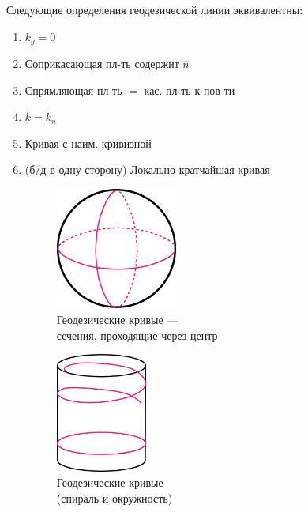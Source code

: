 \documentclass[main]{subfiles}
\begin{document}
    \begin{utv}
        Следующие определения геодезической линии эквивалентны:
        \begin{enumerate}
          \item $k_g = 0$
          \item Соприкасающая пл-ть содержит $\overline{n}$
          \item Спрямляющая пл-ть $=$ кас. пл-ть к пов-ти
          \item $k = k_n$
          \item Кривая с наим. кривизной
          \item (б/д в одну сторону) Локально кратчайшая кривая
          \begin{figure}[H]
              \includegraphics[width=4cm]{pics/11_4.png}
              \centering
              \caption{Геодезические кривые ---\\
              сечения, проходящие через центр}
          \end{figure}
          \begin{figure}[H]
              \includegraphics[width=3cm]{pics/11_5.png}
              \centering
              \caption{Геодезические кривые\\
              (спираль и окружность)}
          \end{figure}
        \end{enumerate}
    \end{utv}
\end{document}
